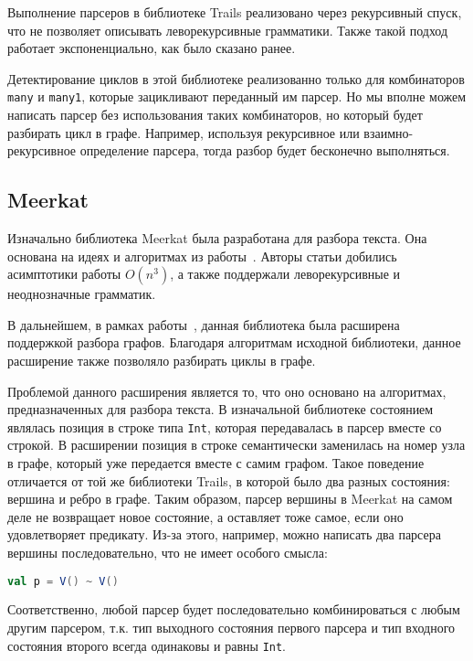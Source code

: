 Выполнение парсеров в библиотеке Trails реализовано через рекурсивный спуск, что не позволяет описывать леворекурсивные грамматики.
Также такой подход работает экспоненциально, как было сказано ранее.

Детектирование циклов в этой библиотеке реализованно только для комбинаторов \verb|many| и \verb|many1|, которые зацикливают переданный им парсер. 
Но мы вполне можем написать парсер без использования таких комбинаторов, но который будет разбирать цикл в графе.
Например, используя рекурсивное или взаимно-рекурсивное определение парсера, тогда разбор будет бесконечно выполняться.

\subsection{Meerkat}

Изначально библиотека Meerkat была разработана для разбора текста. Она основана на идеях и алгоритмах из работы~\cite{Meerkat}. 
Авторы статьи добились асимптотики работы $O(n^3)$, а также поддержали леворекурсивные и неоднозначные грамматик.

В дальнейшем, в рамках работы~\cite{MeerkatGraphs}, данная библиотека была расширена поддержкой разбора графов. Благодаря алгоритмам исходной библиотеки, данное расширение также позволяло разбирать циклы в графе.

Проблемой данного расширения является то, что оно основано на алгоритмах, предназначенных для разбора текста.
В изначальной библиотеке состоянием являлась позиция в строке типа \verb|Int|, которая передавалась в парсер вместе со строкой.
В расширении позиция в строке семантически заменилась на номер узла в графе, который уже передается вместе с самим графом.
Такое поведение отличается от той же библиотеки Trails, в которой было два разных состояния: вершина и ребро в графе.
Таким образом, парсер вершины в Meerkat на самом деле не возвращает новое состояние, а оставляет тоже самое, если оно удовлетворяет предикату.
Из-за этого, например, можно написать два парсера вершины последовательно, что не имеет особого смысла:
\begin{lstlisting}[language=Scala, numbers=none, frame=none]
val p = V() ~ V()
\end{lstlisting}

Соответственно, любой парсер будет последовательно комбинироваться с любым другим парсером, т.к. тип выходного состояния первого парсера и тип входного состояния второго всегда одинаковы и равны \verb|Int|.

